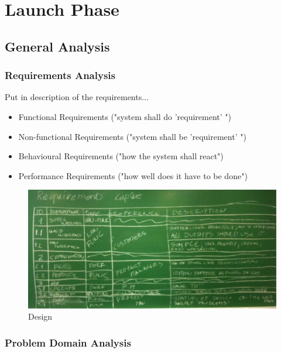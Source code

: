 \newpage
\section{Launch Phase}
\subsection{General Analysis}
	\subsubsection{Requirements	 Analysis}
		Put in description of the requirements...
		\begin{itemize}
			\item Functional Requirements ("system shall do 'requirement' ")
			\item Non-functional Requirements ("system shall be 'requirement' ")
			\item Behavioural Requirements ("how the system shall react")
			\item Performance Requirements ("how well does it have to be done")
		\end{itemize}
		\begin{figure}[h!]		%
			\begin{centering}
				 \includegraphics[width=1.0\textwidth]{images/requirement_capture.JPG}
		 		\caption{Design}
			 \end{centering}
		\end{figure}
	\subsubsection{Problem Domain Analysis}
